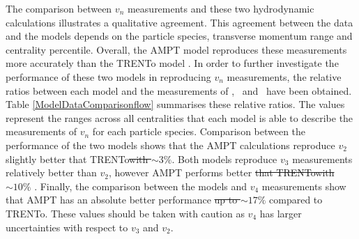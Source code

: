 \documentclass[ALICE,manyauthors]{cernphprep}
\providecommand{\DIFaddtex}[1]{{\protect\color{blue}\uwave{#1}}} %
\providecommand{\DIFdeltex}[1]{{\protect\color{red}\sout{#1}}}                      %
\providecommand{\DIFaddbegin}{} %
\providecommand{\DIFaddend}{} %
\providecommand{\DIFdelbegin}{} %
\providecommand{\DIFdelend}{} %
\providecommand{\DIFadd}[1]{\texorpdfstring{\DIFaddtex{#1}}{#1}} %
\providecommand{\DIFdel}[1]{\texorpdfstring{\DIFdeltex{#1}}{}} %
\newcommand{\DIFscaledelfig}{0.5}
\newlength{\DIFdelgraphicswidth} %
\newlength{\DIFdelgraphicsheight} %
\newcommand{\DIFaddincludegraphics}[2][]{{\color{blue}\fbox{\DIFOincludegraphics[#1]{#2}}}} %
\newcommand{\DIFdelincludegraphics}[2][]{%
\sbox{\DIFdelgraphicsbox}{\DIFOincludegraphics[#1]{#2}}%
\settoboxwidth{\DIFdelgraphicswidth}{\DIFdelgraphicsbox} %
\settoboxtotalheight{\DIFdelgraphicsheight}{\DIFdelgraphicsbox} %
\scalebox{\DIFscaledelfig}{%
\parbox[b]{\DIFdelgraphicswidth}{\usebox{\DIFdelgraphicsbox}\\[-\baselineskip] \rule{\DIFdelgraphicswidth}{0em}}\llap{\resizebox{\DIFdelgraphicswidth}{\DIFdelgraphicsheight}{%
\setlength{\unitlength}{\DIFdelgraphicswidth}%
\begin{picture}(1,1)%
\thicklines\linethickness{2pt} %
{\color[rgb]{1,0,0}\put(0,0){\framebox(1,1){}}}%
{\color[rgb]{1,0,0}\put(0,0){\line( 1,1){1}}}%
{\color[rgb]{1,0,0}\put(0,1){\line(1,-1){1}}}%
\end{picture}%
}\hspace*{3pt}}} %
} %
\DeclareRobustCommand{\DIFaddbegin}{\DIFOaddbegin \let\includegraphics\DIFaddincludegraphics} %
\DeclareRobustCommand{\DIFaddend}{\DIFOaddend \let\includegraphics\DIFOincludegraphics} %
\DeclareRobustCommand{\DIFdelbegin}{\DIFOdelbegin \let\includegraphics\DIFdelincludegraphics} %
\DeclareRobustCommand{\DIFdelend}{\DIFOaddend \let\includegraphics\DIFOincludegraphics} %
\begin{document}
The comparison between $v_{n}$ measurements and these two hydrodynamic calculations illustrates a qualitative agreement. This agreement between the data and the models depends on the particle species, transverse momentum range and centrality percentile. Overall, the AMPT model reproduces these measurements more accurately than the TRENTo model \cite{Acharya:2018zuq}. In order to further investigate the performance of these two models in reproducing $v_{n}$ measurements, the relative ratios between each model and the measurements of \pion, \kaon~and \proton~have been obtained. Table \ref{ModelDataComparisonflow} summarises these relative ratios. The values represent the ranges across all centralities that each model is able to describe the measurements of $v_n$ for each particle species. Comparison between the performance of the two models shows that the AMPT calculations reproduce $v_{2}$ slightly better that TRENTo\DIFdelbegin \DIFdel{with $\sim3\%$}\DIFdelend . Both models reproduce \DIFaddbegin \DIFadd{the }\DIFaddend $v_{3}$ measurements relatively better than $v_{2}$, however AMPT performs better \DIFdelbegin \DIFdel{that TRENTowith $\sim10\%$ }\DIFdelend \DIFaddbegin \DIFadd{than TRENTo}\DIFaddend . Finally, the comparison between the models and $v_{4}$ measurements show that AMPT has an absolute better performance \DIFdelbegin \DIFdel{up to $\sim17\%$ }\DIFdelend compared to TRENTo. These values should be taken with caution as $v_{4}$ has larger uncertainties with respect to $v_{3}$ and $v_{2}$. 

\begin{table}[!h]
\centering
{}

\caption{List of minimum and maximum value of the fit to relative ratios between the data and each model for  $v_{n} (n=2,3,4)$ of \pion, \kaon~and \proton. The minimum and maximum are obtained from 0-5\% up to 40-50\% centrality intervals .}\label{ModelDataComparisonflow}
\end{table}
\end{document}
